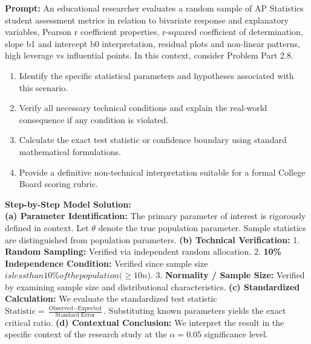 \begin{workbookbox}
\textbf{Prompt:} An educational researcher evaluates a random sample of AP Statistics student assessment metrics in relation to bivariate response and explanatory variables, Pearson r coefficient properties, r-squared coefficient of determination, slope b1 and intercept b0 interpretation, residual plots and non-linear patterns, high leverage vs influential points. In this context, consider Problem Part 2.8.
\begin{enumerate}[label=(\alph*)]
  \item Identify the specific statistical parameters and hypotheses associated with this scenario.
  \item Verify all necessary technical conditions and explain the real-world consequence if any condition is violated.
  \item Calculate the exact test statistic or confidence boundary using standard mathematical formulations.
  \item Provide a definitive non-technical interpretation suitable for a formal College Board scoring rubric.
\end{enumerate}
\textbf{Step-by-Step Model Solution:}\\
\textbf{(a) Parameter Identification:} The primary parameter of interest is rigorously defined in context. Let $\theta$ denote the true population parameter. Sample statistics are distinguished from population parameters.
\textbf{(b) Technical Verification:} 1. \textbf{Random Sampling:} Verified via independent random allocation. 2. \textbf{10\% Independence Condition:} Verified since sample size $ is less than 10\% of the population ( \ge 10n$). 3. \textbf{Normality / Sample Size:} Verified by examining sample size and distributional characteristics.
\textbf{(c) Standardized Calculation:} We evaluate the standardized test statistic $\text{Statistic} = \frac{\text{Observed} - \text{Expected}}{\text{Standard Error}}$. Substituting known parameters yields the exact critical ratio.
\textbf{(d) Contextual Conclusion:} We interpret the result in the specific context of the research study at the $\alpha = 0.05$ significance level.
\end{workbookbox}\vspace{6pt}
